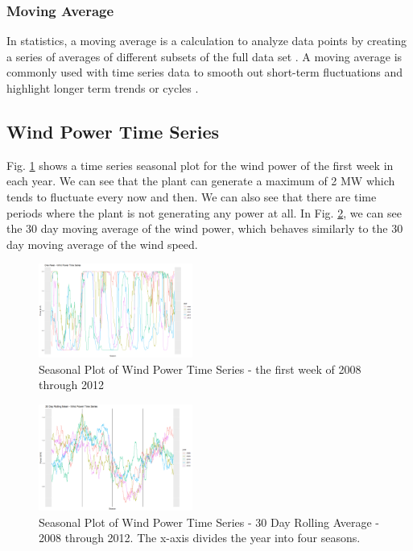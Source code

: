 \documentclass{IEEEtran}
\begin{document}
  \subsubsection{Moving Average}

  In statistics, a moving average is a calculation to analyze data points by creating a series of averages of different subsets of the full data set \cite{average}. A moving average is commonly used with time series data to smooth out short-term fluctuations and highlight longer term trends or cycles \cite{average}.

  \subsection{Wind Power Time Series}

  Fig. \ref{fig:seasonal3} shows a time series seasonal plot for the wind power of the first week in each year. We can see that the plant can generate a maximum of 2 MW which tends to fluctuate every now and then. We can also see that there are time periods where the plant is not generating any power at all. In Fig. \ref{fig:seasonal4}, we can see the 30 day moving average of the wind power, which behaves similarly to the 30 day moving average of the wind speed.

  \begin{figure}[ht]
    \includegraphics[width=0.45\textwidth]{figures/weekpower}
    \caption{Seasonal Plot of Wind Power Time Series - the first week of 2008 through 2012}
    \label{fig:seasonal3}
  \end{figure}

  \begin{figure}
    \centering
    \includegraphics[width=0.45\textwidth]{figures/yearpower}
    \caption{Seasonal Plot of Wind Power Time Series - 30 Day Rolling Average - 2008 through 2012. The x-axis divides the year into four seasons.}
    \label{fig:seasonal4}
  \end{figure}
\end{document}
